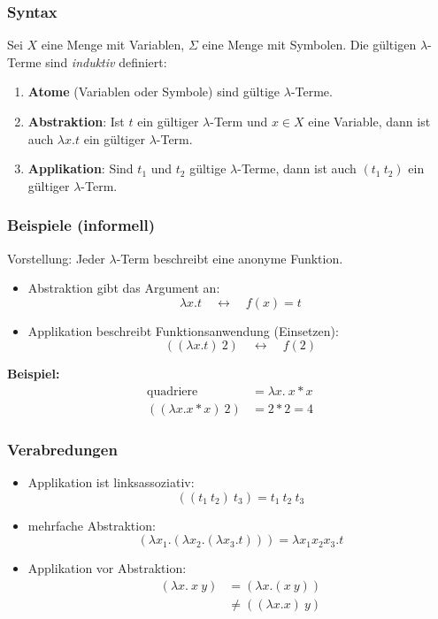 \documentclass{beamer}
\begin{document}
\begin{frame} \frametitle{Syntax}
	Sei $X$ eine Menge mit Variablen, $\Sigma$ eine Menge mit Symbolen. Die gültigen $\lambda$-Terme sind \textit{induktiv} definiert:
	\begin{enumerate}[<+->]
		\item \textbf{Atome} (Variablen oder Symbole) sind gültige $\lambda$-Terme.
		\item \textbf{Abstraktion}: Ist $t$ ein gültiger $\lambda$-Term und $x \in X$ eine Variable, dann ist auch $\lambda x . t$ ein gültiger $\lambda$-Term.
		\item \textbf{Applikation}: Sind $t_1$ und $t_2$ gültige $\lambda$-Terme, dann ist auch $(t_1 \ t_2)$ ein gültiger $\lambda$-Term.
	\end{enumerate}
\end{frame}

\begin{frame} \frametitle{Beispiele (informell)}
	Vorstellung: Jeder $\lambda$-Term beschreibt eine anonyme Funktion.
	\begin{itemize}[<+->]
		\item Abstraktion gibt das Argument an: 
		\begin{equation*}
		\lambda x . t \quad \leftrightarrow \quad f(x) = t
		\end{equation*}
		\item Applikation beschreibt Funktionsanwendung (Einsetzen): 
		\begin{equation*}
			((\lambda x . t) \ 2) \quad \leftrightarrow \quad f(2)
		\end{equation*}
	\end{itemize}

	\pause
	
	\textbf{Beispiel:}
	\begin{align*}
		\text{quadriere } &= \lambda x . \ x*x \\
		((\lambda x . x*x) \ 2) &= 2 * 2 = 4
	\end{align*}
\end{frame}

\begin{frame} \frametitle{Verabredungen}
	\begin{itemize}[<+->]
		\item Applikation ist linksassoziativ:
		\begin{equation*}
			((t_1 \ t_2) \ t_3) = t_1 \ t_2 \ t_3 
		\end{equation*}
		\item mehrfache Abstraktion:
		\begin{equation*}
			(\lambda x_1 . (\lambda x_2 . (\lambda x_3 . t))) = \lambda x_1 x_2 x_3 . t 
		\end{equation*}
		\item Applikation vor Abstraktion:
		\begin{align*}
			(\lambda x . \ x \ y) &= (\lambda x . (x \ y)) \\
			&\neq ((\lambda x . x) \ y)
		\end{align*}
	\end{itemize}
\end{frame}
\end{document}
